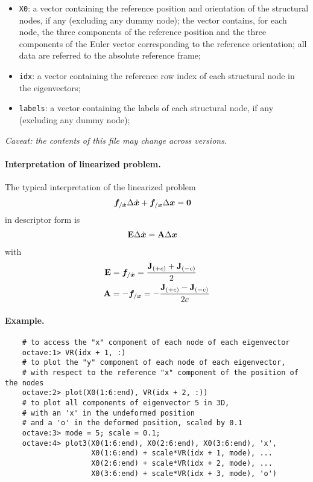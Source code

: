\begin{itemize}
\item \texttt{X0}: a vector containing the reference position
and orientation of the structural nodes, if any (excluding any dummy node);
the vector contains, for each node, the three components
of the reference position and the three components of the Euler vector
corresponding to the reference orientation; all data are referred
to the absolute reference frame;

\item \texttt{idx}: a vector containing the reference row index
  of each structural node in the eigenvectors;

\item \texttt{labels}: a vector containing the labels of each structural node, if any (excluding any dummy node);
\end{itemize}

\emph{Caveat: the contents of this file may change across versions.}

\paragraph{Interpretation of linearized problem.}
The typical interpretation of the linearized problem
\begin{align}
	\boldsymbol{f}_{/\dot{\boldsymbol{x}}} \Delta\dot{\boldsymbol{x}} + \boldsymbol{f}_{/\boldsymbol{x}} \Delta\boldsymbol{x} &= \boldsymbol{0}
\end{align}
in descriptor form is
\begin{align}
	\bm{\mathbf E} \Delta\dot{\boldsymbol{x}} &= \bm{\mathbf A} \Delta\boldsymbol{x}
\end{align}
with
\begin{subequations}
\begin{align}
	\bm{\mathbf E} &= \boldsymbol{f}_{/\dot{\boldsymbol{x}}} = \frac{\bm{\mathbf J}_{(+c)} + \bm{\mathbf J}_{(-c)}}{2}
	\\
	\bm{\mathbf A} &= - \boldsymbol{f}_{/\boldsymbol{x}} = - \frac{\bm{\mathbf J}_{(+c)} - \bm{\mathbf J}_{(-c)}}{2 c}
\end{align}
\end{subequations}


\paragraph{Example.}
\begin{verbatim}
    # to access the "x" component of each node of each eigenvector
    octave:1> VR(idx + 1, :)
    # to plot the "y" component of each node of each eigenvector,
    # with respect to the reference "x" component of the position of the nodes
    octave:2> plot(X0(1:6:end), VR(idx + 2, :))
    # to plot all components of eigenvector 5 in 3D,
    # with an 'x' in the undeformed position
    # and a 'o' in the deformed position, scaled by 0.1
    octave:3> mode = 5; scale = 0.1;
    octave:4> plot3(X0(1:6:end), X0(2:6:end), X0(3:6:end), 'x',
                    X0(1:6:end) + scale*VR(idx + 1, mode), ...
                    X0(2:6:end) + scale*VR(idx + 2, mode), ...
                    X0(3:6:end) + scale*VR(idx + 3, mode), 'o')
\end{verbatim}



